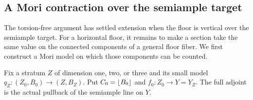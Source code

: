 \subsection{A Mori contraction over the semiample target}

The torsion-free argument has settled extension when the floor is
vertical over the semiample target.  For a horizontal floor, it remains
to make a section take the same value on the connected components of a
general floor fiber.  We first construct a Mori model on which those
components can be counted.

Fix a stratum \(Z\) of dimension one, two, or three and its small model
\(q_Z:(Z_0,B_0)\to(Z,B_Z)\).  Put \(C_0=\left\lfloor B_0\right\rfloor\) and
\(f_0:Z_0\to Y=Y_Z\).  The full adjoint is the actual pullback of the
semiample line on \(Y\).

